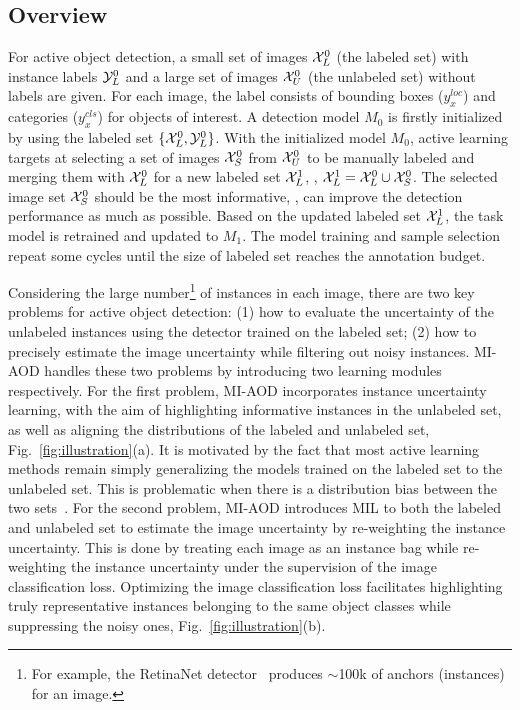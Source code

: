 \documentclass[final]{cvpr}
\begin{document}
\subsection{Overview}
For active object detection, a small set of images ${\cal X}^0_L$ (the labeled set) with instance labels ${\cal Y}^0_L$ and a large set of images ${\cal X}^0_U$ (the unlabeled set) without labels are given. For each image, the label consists of bounding boxes ($y_x^{loc}$) and categories ($y_x^{cls}$) for objects of interest. A detection model $M_0$ is firstly initialized by using the labeled set $\{{\cal X}^0_L, {\cal Y}^0_L\}$. With the initialized model $M_0$, active learning targets at selecting a set of images ${\cal X}_S^0$ from ${\cal X}^0_U$ to be manually labeled and merging them with ${\cal X}^0_L$ for a new labeled set ${\cal X}^1_L$, \ie, ${\cal X}^1_L = {\cal X}^0_L \cup {\cal X}^0_S$. The selected image set ${\cal X}_S^0$ should be the most informative, \ie, can improve the detection performance as much as possible. Based on the updated labeled set ${\cal X}^1_L$, the task model is retrained and updated to $M_1$. The model training and sample selection repeat some cycles until the size of labeled set reaches the annotation budget. 

Considering the large number\footnote{For example, the RetinaNet detector~\cite{RetinaNet20} produces $\sim$100k of anchors (instances) for an image.} of instances in each image, there are two key problems for active object detection: (1) how to evaluate the uncertainty of the unlabeled instances using the detector trained on the labeled set; (2) how to precisely estimate the image uncertainty while filtering out noisy instances. MI-AOD handles these two problems by introducing two learning modules respectively. For the first problem, MI-AOD incorporates instance uncertainty learning, with the aim of highlighting informative instances in the unlabeled set, as well as aligning the distributions of the labeled and unlabeled set, Fig.~\ref{fig:illustration}(a). It is motivated by the fact that most active learning methods remain simply generalizing the models trained on the labeled set to the unlabeled set. This is problematic when there is a distribution bias between the two sets~\cite{SelfSupervised2020}. For the second problem, MI-AOD introduces MIL to both the labeled and unlabeled set to estimate the image uncertainty by re-weighting the instance uncertainty. This is done by treating each image as an instance bag while re-weighting the instance uncertainty under the supervision of the image classification loss. Optimizing the image classification loss facilitates highlighting truly representative instances belonging to the same object classes while suppressing the noisy ones, Fig.~\ref{fig:illustration}(b). 
\end{document}
